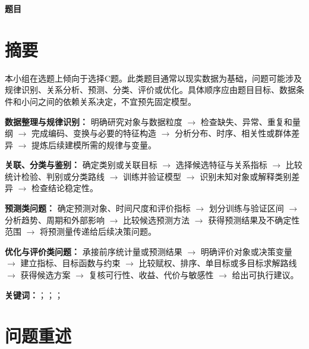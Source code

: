 \documentclass[UTF8,a4paper,12pt]{ctexart}
\newcommand{\ModelBoldFont}{\CJKfamily{modelboldhei}\bfseries}
\newif\ifshowguide
\newcommand{\WriteGuide}[3]{%
  \ifshowguide
  \begin{quote}
    \small
    \textbf{写什么：}#1\par
    \textbf{怎么写：}#2\par
    \textbf{避免：}#3
  \end{quote}
  \fi
}
\begin{document}
\begin{center}
  {\ModelBoldFont\fontsize{22pt}{28pt}\selectfont 题目\par}
\end{center}

\vspace{1em}

\section*{摘要}

\WriteGuide
  {说明小组的选题倾向，并概括C题在不同任务类型下可能采用的建模流程。}
  {流程应随题目数据、目标和小问依赖关系调整，不要求每个问题固定使用某一种模型。正式成文时，再将流程替换为本题实际采用的方法和所得结论。}
  {提前写死算法；只罗列模型名称；不说明前后小问的输入输出关系；把流程直接当成最终答案。}

本小组在选题上倾向于选择C题。此类题目通常以现实数据为基础，问题可能涉及规律识别、关系分析、预测、分类、评价或优化。具体顺序应由题目目标、数据条件和小问之间的依赖关系决定，不宜预先固定模型。

\noindent\textbf{数据整理与规律识别：}
明确研究对象与数据粒度 $\rightarrow$ 检查缺失、异常、重复和量纲 $\rightarrow$
完成编码、变换与必要的特征构造 $\rightarrow$ 分析分布、时序、相关性或群体差异 $\rightarrow$
提炼后续建模所需的规律与变量。

\noindent\textbf{关联、分类与鉴别：}
确定类别或关联目标 $\rightarrow$ 选择候选特征与关系指标 $\rightarrow$
比较统计检验、判别或分类路线 $\rightarrow$ 训练并验证模型 $\rightarrow$
识别未知对象或解释类别差异 $\rightarrow$ 检查结论稳定性。

\noindent\textbf{预测类问题：}
确定预测对象、时间尺度和评价指标 $\rightarrow$ 划分训练与验证区间 $\rightarrow$
分析趋势、周期和外部影响 $\rightarrow$ 比较候选预测方法 $\rightarrow$
获得预测结果及不确定性范围 $\rightarrow$ 将预测量传递给后续决策问题。

\noindent\textbf{优化与评价类问题：}
承接前序统计量或预测结果 $\rightarrow$ 明确评价对象或决策变量 $\rightarrow$
建立指标、目标函数与约束 $\rightarrow$ 比较赋权、排序、单目标或多目标求解路线 $\rightarrow$
获得候选方案 $\rightarrow$ 复核可行性、收益、代价与敏感性 $\rightarrow$ 给出可执行建议。

\noindent\textbf{关键词：}\qquad\qquad；\qquad\qquad；\qquad\qquad；\qquad\qquad

\section{问题重述}
\end{document}
